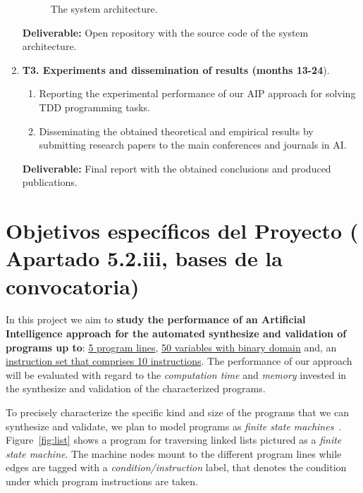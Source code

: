 \documentclass[10pt,a4paper]{paper}
\begin{document}
\begin{enumerate}
\begin{figure}[hbt!]
\begin{center}
\end{center}  
\caption{\small The system architecture.}
\label{fig:architecture}
\end{figure}

{\small {\bf Deliverable:} Open repository with the source code of the system architecture.}
    
\item {\bf T3. Experiments and dissemination of results (months 13-24}).
   \begin{small}
      \begin{enumerate}
      \item Reporting the experimental performance of our AIP approach for solving TDD programming tasks.
      \item Disseminating the obtained theoretical and empirical results by submitting research papers to the main conferences and journals in AI.        
      \end{enumerate}
\end{small}        
{\small {\bf Deliverable:} Final report with the obtained conclusions and produced publications.}
\end{enumerate}


\section{Objetivos específicos del Proyecto ( Apartado 5.2.iii, bases de la convocatoria)}
\label{subsec:objectivos}

In this project we aim to {\bf study the performance of an Artificial Intelligence approach for the automated synthesize and validation of programs up to}: \underline{5 program lines}, \underline{50 variables with binary domain} and, an \\\underline{instruction set that comprises 10 instructions}. The performance of our approach will be evaluated with regard to the {\em computation time} and {\em memory} invested in the synthesize and validation of the characterized programs.

To precisely characterize the specific kind and size of the programs that we can synthesize and validate, we plan to model programs as {\em finite state machines}~\cite{sergio:aprograming:ijcai16}. Figure~\ref{fig:list} shows a program for traversing linked lists pictured as a {\em finite state machine}. The machine nodes mount to the different program lines while edges are tagged with a {\em condition/instruction} label, that denotes the condition under which program instructions are taken.
\end{document}

